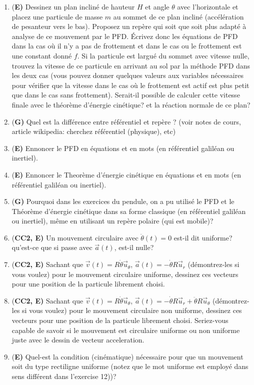 \documentclass[french,12pt]{article}
\begin{document}
\begin{enumerate}
\begin{enumerate}
\end{enumerate}

\item {(\bf E)} Dessinez un plan incliné de hauteur $H$ et angle $\theta$ avec l'horizontale et placez une particule de masse $m$ au sommet de ce plan incliné (accélération de pesanteur vers le bas). Proposez un repère qui soit que soit plus adapté à analyse de ce mouvement par le PFD. Écrivez donc les équations de PFD dans la cas où il n'y a pas de frottement et dans le cas ou le frottement est une constant donné $f$. Si la particule est largué du sommet avec vitesse nulle, trouvez la vitesse de ce particule en arrivant au sol par la méthode PFD dans les deux cas (vous pouvez donner quelques valeurs aux variables nécessaires pour vérifier que la vitesse dans le cas où le frottement est actif est plus petit que dans le cas sans frottement). Serait-il possible de calculer cette vitesse finale avec le théorème d'énergie cinétique? et la réaction normale de ce plan?     


\item {(\bf G)} Quel est la différence entre référentiel et repère ? (voir notes de cours, article wikipedia: cherchez référentiel (physique), etc)
\item {(\bf E)} Ennoncer le PFD en équations et en mots (en référentiel galiléan ou inertiel). 
\item {(\bf E)} Ennoncer le Theorème d'énergie cinétique en équations et en mots (en référentiel galiléan ou inertiel).
\item {(\bf G)} Pourquoi dans les exercices du pendule, on a pu utilisé le PFD et le Théorème d'énergie cinétique dans sa forme classique (en référentiel galiléan ou inertiel), même en utilisant un repère polaire (qui est mobile)?  
\item {(\bf CC2, E)} Un mouvement circulaire avec $\ddot{\theta}(t) = 0$ est-il dit uniforme? qu'est-ce que si passe avec $\Vec{a}(t)$, est-il nulle?
\item {(\bf CC2, E)} Sachant que $\Vec{v}(t) = R\dot{\theta} \Vec{u}_{\theta}$, $\Vec{a}(t) = - \dot{\theta} R \Vec{u}_r$ (démontrez-les si vous voulez) pour le mouvement circulaire uniforme, dessinez ces vecteurs pour une position de la particule librement choisi.
\item {(\bf CC2, E)} Sachant que $\Vec{v}(t) = R\dot{\theta} \Vec{u}_{\theta}$, $\Vec{a}(t) = - \dot{\theta} R \Vec{u}_r + \ddot{\theta} R \Vec{u}_{\theta}$ (démontrez-les si vous voulez) pour le mouvement circulaire non uniforme, dessinez ces vecteurs pour une position de la particule librement choisi. Seriez-vous capable de savoir si le mouvement est circulaire uniforme ou non uniforme juste avec le dessin de vecteur acceleration. 
\item {(\bf E)} Quel-est la condition (cinématique) nécessaire pour que un mouvement soit du type rectiligne uniforme (notez que le mot uniforme est employé dans sens différent dans l'exercise 12))? 
 

\end{enumerate}
\end{document}
